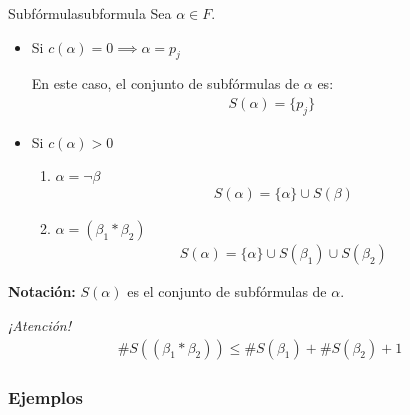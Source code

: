 \begin{definicion}{Subfórmula}{subformula}
    Sea $\alpha \in F$.

    \medskip

    \begin{itemize}
        \item {}%
            Si $c(\alpha) = 0 \implies \alpha = p_j $

            En este caso, el conjunto de subfórmulas de $\alpha$ es:
            \begin{gather*}
                S(\alpha)=\{ p_j \}
            \end{gather*}

        \item Si $c(\alpha) > 0$
            \begin{enumerate}
                \item $\alpha = \neg \beta$
                    \begin{gather*}
                        S(\alpha) = \{ \alpha \} \cup S(\beta)
                    \end{gather*}
                \item {}%
                    $\alpha = (\beta_1 * \beta_2)$
                    \begin{gather*}
                        S(\alpha)=\{ \alpha \}\cup S(\beta_1) \cup S(\beta_2)
                    \end{gather*}
            \end{enumerate}
    \end{itemize}

    \bigskip
    \textbf{Notación:}
    $S(\alpha)$ es el conjunto de subfórmulas de $\alpha$.
\end{definicion}

\bigskip
\textit{¡Atención!}
\begin{gather*}
    \# S((\beta_1 * \beta_2)) \leq \# S(\beta_1) + \# S(\beta_2) + 1
\end{gather*}

\subsubsection{Ejemplos}

